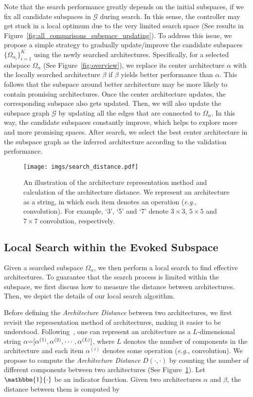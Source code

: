 \documentclass[lettersize,journal]{IEEEtran}
\def\mG{{\mathcal G}}
\def\eg{\emph{e.g.}} \def\Eg{\emph{E.g.}}
\begin{document}
Note that the search performance greatly depends on the initial subspaces, if we fix all candidate subspaces in $\mG$ during search. In this sense, the controller may get stuck in a local optimum due to the very limited search space
(See results in Figure~\ref{fig:all_comparisons_subspace_updating}).
To address this issue, we propose a simple strategy to gradually update/improve the candidate subspaces $\{\Omega_{\alpha_i}\}_{i=1}^{K}$ using the newly searched architectures.
Specifically, for a selected subspace $\Omega_{\alpha}$ (See Figure~\ref{fig:overview}), we replace its center architecture $\alpha$ with the locally searched architecture $\beta$ if $\beta$ yields better performance than $\alpha$.
This follows that the subspace around better architecture may be more likely to contain promising architectures.
Once the center architecture updates, the corresponding subspace also gets updated.
Then, we will also update the subspace graph $\mG$ by updating all the edges that are connected to $\Omega_{\alpha}$. In this way, the candidate subspaces constantly improve, which helps to explore more and more promising spaces. After search, we select the best center architecture in the subspace graph as the inferred architecture according to the validation performance.


\begin{figure}[t]
\centering
\texttt{[image: imgs/search\_distance.pdf]}
\caption{An illustration of the architecture representation method and calculation of the architecture distance.
We represent an architecture as a string, in which each item denotes an operation (\eg, convolution).
For example, `3', `5' and `7' denote $3\times3$, $5\times5$ and $7\times7$ convolution, respectively.
}
\label{fig:arch_representation}
\end{figure}

\subsection{Local Search within the Evoked Subspace}
\label{sec:local_search}

Given a searched subspace $\Omega_{\alpha}$,
we then perform a local search to find effective architectures.
To guarantee that the search process is limited within the subspace,
we first discuss how to measure the distance between architectures. 
Then, we depict the details of our local search algorithm.


Before defining the \emph{Architecture Distance} between two architectures, we first revisit the representation method of architectures, making it easier to be understood.
Following~\cite{Cai2020Once,pham2018efficient}, one can represent an architecture as a $L$-dimensional string $\alpha \small{=} [\alpha^{(1)}, \alpha^{(2)}, \cdots, \alpha^{(L)}]$, where $L$ denotes the number of components in the architecture and each item $\alpha^{(i)}$ denotes some operation (\eg, convolution).
We propose to compute the \emph{Architecture Distance} $D(\cdot,\cdot)$ by counting the number of different components between two architectures (See Figure~\ref{fig:arch_representation}).
Let $\mathbbm{1}\{\cdot\}$ be an indicator function.
Given two architectures $\alpha$ and $\beta$, the distance between them is computed by
\end{document}
